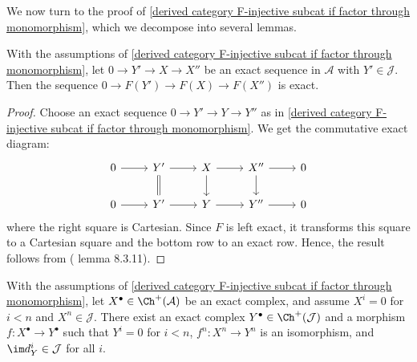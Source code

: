 We now turn to the proof of \cref{derived category F-injective subcat if factor through monomorphism}, which we decompose into several lemmas.
\begin{lemma}\label{derived category F-acyclic if factor through monomorphism}
With the assumptions of \cref{derived category F-injective subcat if factor through monomorphism}, let $0\to Y'\to X\to X''$ be an exact sequence in $\mathcal{A}$ with $Y'\in\mathcal{J}$. Then the sequence $0\to F(Y')\to F(X)\to F(X'')$ is exact.
\end{lemma}
\begin{proof}
Choose an exact sequence $0\to Y'\to Y\to Y''$ as in \cref{derived category F-injective subcat if factor through monomorphism}. We get the commutative exact diagram:
\[\begin{tikzcd}
0\ar[r]&Y'\ar[d,equal]\ar[r]&X\ar[r]\ar[d]&X''\ar[r]\ar[d]&0\\
0\ar[r]&Y'\ar[r]&Y\ar[r]&Y''\ar[r]&0
\end{tikzcd}\]
where the right square is Cartesian. Since $F$ is left exact, it transforms this square to a Cartesian square and the bottom row to an exact row. Hence, the result follows from (\cite{kashiwara_SAC} lemma 8.3.11).
\end{proof}
\begin{lemma}\label{derived category truncation resolution if factor through monomorphism}
With the assumptions of \cref{derived category F-injective subcat if factor through monomorphism}, let $X^\bullet\in\Ch^+(\mathcal{A})$ be an exact complex, and assume $X^i=0$ for $i<n$ and $X^n\in\mathcal{J}$. There exist an exact complex $Y^\bullet\in\Ch^+(\mathcal{J})$ and a morphism $f:X^\bullet\to Y^\bullet$ such that $Y^i=0$ for $i<n$, $f^n:X^n\to Y^n$ is an isomorphism, and $\im d^i_Y\in\mathcal{J}$ for all $i$.
\end{lemma}
